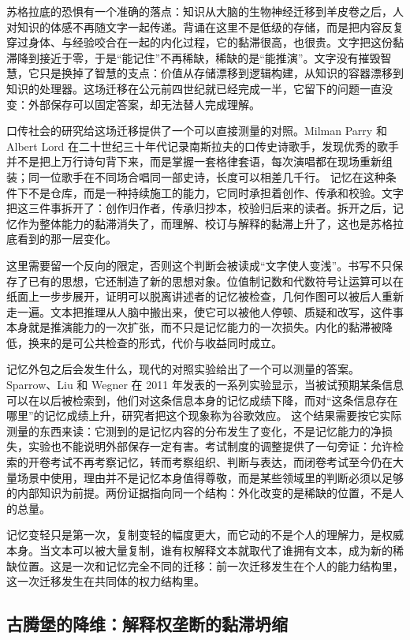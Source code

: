 苏格拉底的恐惧有一个准确的落点：知识从大脑的生物神经迁移到羊皮卷之后，人对知识的体感不再随文字一起传递。背诵在这里不是低级的存储，而是把内容反复穿过身体、与经验咬合在一起的内化过程，它的黏滞很高，也很贵。文字把这份黏滞降到接近于零，于是“能记住”不再稀缺，稀缺的是“能推演”。文字没有摧毁智慧，它只是换掉了智慧的支点：价值从存储漂移到逻辑构建，从知识的容器漂移到知识的处理器。这场迁移在公元前四世纪就已经完成一半，它留下的问题一直没变：外部保存可以固定答案，却无法替人完成理解。

口传社会的研究给这场迁移提供了一个可以直接测量的对照。Milman Parry 和 Albert Lord 在二十世纪三十年代记录南斯拉夫的口传史诗歌手，发现优秀的歌手并不是把上万行诗句背下来，而是掌握一套格律套语，每次演唱都在现场重新组装；同一位歌手在不同场合唱同一部史诗，长度可以相差几千行。\cite{parry1960singer} 记忆在这种条件下不是仓库，而是一种持续施工的能力，它同时承担着创作、传承和校验。文字把这三件事拆开了：创作归作者，传承归抄本，校验归后来的读者。拆开之后，记忆作为整体能力的黏滞消失了，而理解、校订与解释的黏滞上升了，这也是苏格拉底看到的那一层变化。

这里需要留一个反向的限定，否则这个判断会被读成“文字使人变浅”。书写不只保存了已有的思想，它还制造了新的思想对象。位值制记数和代数符号让运算可以在纸面上一步步展开，证明可以脱离讲述者的记忆被检查，几何作图可以被后人重新走一遍。文本把推理从人脑中搬出来，使它可以被他人停顿、质疑和改写，这件事本身就是推演能力的一次扩张，而不只是记忆能力的一次损失。内化的黏滞被降低，换来的是可公共检查的形式，代价与收益同时成立。

记忆外包之后会发生什么，现代的对照实验给出了一个可以测量的答案。Sparrow、Liu 和 Wegner 在 2011 年发表的一系列实验显示，当被试预期某条信息可以在以后被检索到，他们对这条信息本身的记忆成绩下降，而对“这条信息存在哪里”的记忆成绩上升，研究者把这个现象称为谷歌效应。\cite{sparrow2011google} 这个结果需要按它实际测量的东西来读：它测到的是记忆内容的分布发生了变化，不是记忆能力的净损失，实验也不能说明外部保存一定有害。考试制度的调整提供了一句旁证：允许检索的开卷考试不再考察记忆，转而考察组织、判断与表达，而闭卷考试至今仍在大量场景中使用，理由并不是记忆本身值得尊敬，而是某些领域里的判断必须以足够的内部知识为前提。两份证据指向同一个结构：外化改变的是稀缺的位置，不是人的总量。

记忆变轻只是第一次，复制变轻的幅度更大，而它动的不是个人的理解力，是权威本身。当文本可以被大量复制，谁有权解释文本就取代了谁拥有文本，成为新的稀缺位置。这是一次和记忆完全不同的迁移：前一次迁移发生在个人的能力结构里，这一次迁移发生在共同体的权力结构里。

\subsection{古腾堡的降维：解释权垄断的黏滞坍缩}

